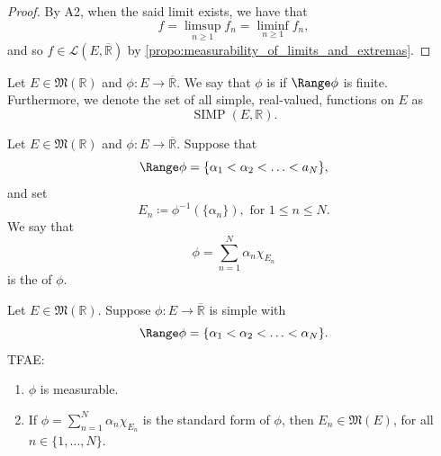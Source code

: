 \documentclass[notoc,notitlepage]{tufte-book}
\DeclareMathOperator{\SIMP}{SIMP}
\begin{document}
\begin{proof}
  By A2, when the said limit exists, we have that
  \begin{equation*}
    f = \limsup_{n \geq 1} f_n = \liminf_{n \geq 1} f_n,
  \end{equation*}
  and so $f \in \mathcal{L}(E, \overline{\mathbb{R}})$ by
  \cref{propo:measurability_of_limits_and_extremas}.
\end{proof}

\begin{defn}\label{defn:simple_functions}
  Let $E \in \mathfrak{M}(\mathbb{R})$ and $\phi : E \to \overline{\mathbb{R}}$.
  We say that $\phi$ is  if $\Range \phi$ is finite.
  Furthermore, we denote the set of all simple, real-valued, 
  functions on $E$ as
  \begin{equation*}
    \SIMP(E, \mathbb{R}).
  \end{equation*}
\end{defn}

\begin{defn}\label{defn:standard_form}
  Let $E \in \mathfrak{M}(\mathbb{R})$ and $\phi : E \to \overline{\mathbb{R}}$.
  Suppose that
  \begin{equation*}
    \Range \phi = \{ \alpha_1 < \alpha_2 < \hdots < a_N \},
  \end{equation*}
  and set
  \begin{equation*}
    E_n \coloneqq \phi^{-1}(\{\alpha_n\}), \text{ for } 1 \leq n \leq N.
  \end{equation*}
  We say that
  \begin{equation*}
    \phi = \sum_{n=1}^{N} \alpha_n \chi_{E_n}
  \end{equation*}
  is the  of $\phi$.
\end{defn}

\begin{propo}\label{propo:measurability_of_simple_functions_with_measurable_support}
  Let $E \in \mathfrak{M}(\mathbb{R})$. Suppose $\phi : E \to
  \overline{\mathbb{R}}$ is simple with
  \begin{equation*}
    \Range \phi = \{ \alpha_1 < \alpha_2 < \hdots < \alpha_N \}.
  \end{equation*}
  TFAE:
  \begin{enumerate}
    \item $\phi$ is measurable.
    \item If $\phi = \sum_{n=1}^{N} \alpha_n \chi_{E_n}$ is the standard form of
      $\phi$, then $E_n \in \mathfrak{M}(E)$, for all $n \in \{1, \ldots, N \}$.
  \end{enumerate}
\end{propo}
\end{document}
